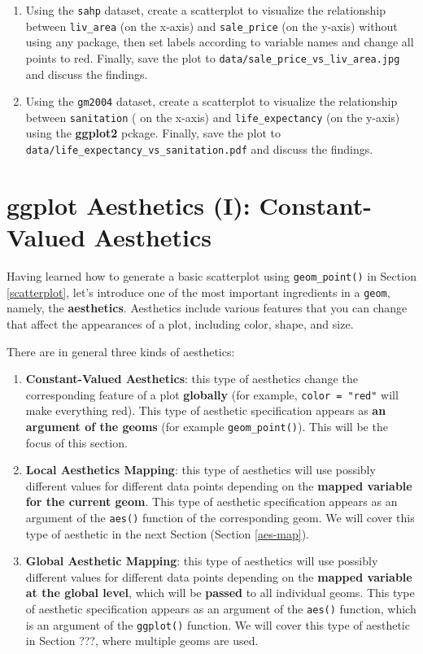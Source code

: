 \documentclass[
]{book}
\providecommand{\tightlist}{%
  \setlength{\itemsep}{0pt}\setlength{\parskip}{0pt}}
\begin{document}
\begin{enumerate}
\def\labelenumi{\arabic{enumi}.}
\tightlist
\item
  Using the \texttt{sahp} dataset, create a scatterplot to visualize the relationship between \texttt{liv\_area} (on the x-axis) and \texttt{sale\_price} (on the y-axis) without using any package, then set labels according to variable names and change all points to red. Finally, save the plot to \texttt{data/sale\_price\_vs\_liv\_area.jpg} and discuss the findings.
\item
  Using the \texttt{gm2004} dataset, create a scatterplot to visualize the relationship between \texttt{sanitation} ( on the x-axis) and \texttt{life\_expectancy} (on the y-axis) using the \textbf{ggplot2} pckage. Finally, save the plot to \texttt{data/life\_expectancy\_vs\_sanitation.pdf} and discuss the findings.
\end{enumerate}

\hypertarget{aes}{%
\section{ggplot Aesthetics (I): Constant-Valued Aesthetics}\label{aes}}

Having learned how to generate a basic scatterplot using \texttt{geom\_point()} in Section \ref{scatterplot}, let's introduce one of the most important ingredients in a \texttt{geom}, namely, the \textbf{aesthetics}. Aesthetics include various features that you can change that affect the appearances of a plot, including color, shape, and size.

There are in general three kinds of aesthetics:

\begin{enumerate}
\def\labelenumi{\arabic{enumi}.}
\item
  \textbf{Constant-Valued Aesthetics}: this type of aesthetics change the corresponding feature of a plot \textbf{globally} (for example, \texttt{color\ =\ "red"} will make everything red). This type of aesthetic specification appears as \textbf{an argument of the geoms} (for example \texttt{geom\_point()}). This will be the focus of this section.
\item
  \textbf{Local Aesthetics Mapping}: this type of aesthetics will use possibly different values for different data points depending on the \textbf{mapped variable for the current geom}. This type of aesthetic specification appears as an argument of the \texttt{aes()} function of the corresponding geom. We will cover this type of aesthetic in the next Section (Section \ref{aes-map}).
\item
  \textbf{Global Aesthetic Mapping}: this type of aesthetics will use possibly different values for different data points depending on the \textbf{mapped variable at the global level}, which will be \textbf{passed} to all individual geoms. This type of aesthetic specification appears as an argument of the \texttt{aes()} function, which is an argument of the \texttt{ggplot()} function. We will cover this type of aesthetic in Section ???, where multiple geoms are used.
\end{enumerate}
\end{document}
